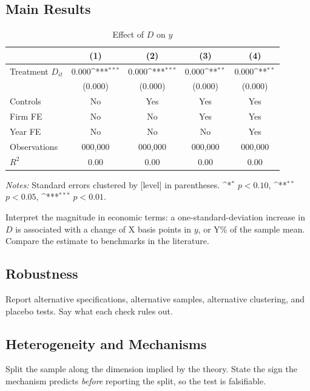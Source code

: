 \documentclass[letterpaper,11pt]{article}
\def\sym#1{\ifmmode^{#1}\else\(^{#1}\)\fi}   %
\begin{document}
\subsection{Main Results}

\begin{table}[htbp]
  \centering
  \caption{Effect of $D$ on $y$}
  \label{tab:main}
  \begin{tabular}{lcccc}
    \toprule
    & (1) & (2) & (3) & (4) \\
    \midrule
    Treatment $D_{it}$ & 0.000\sym{***} & 0.000\sym{***} & 0.000\sym{**} & 0.000\sym{**} \\
                       & (0.000) & (0.000) & (0.000) & (0.000) \\
    \midrule
    Controls           & No  & Yes & Yes & Yes \\
    Firm FE            & No  & No  & Yes & Yes \\
    Year FE            & No  & No  & No  & Yes \\
    Observations       & 000{,}000 & 000{,}000 & 000{,}000 & 000{,}000 \\
    $R^2$              & 0.00 & 0.00 & 0.00 & 0.00 \\
    \bottomrule
  \end{tabular}

  \vspace{0.5em}
  {\footnotesize \textit{Notes:} Standard errors clustered by [level] in
  parentheses. \sym{*} $p<0.10$, \sym{**} $p<0.05$, \sym{***} $p<0.01$.}
\end{table}

Interpret the magnitude in economic terms: a one-standard-deviation increase in
$D$ is associated with a change of X basis points in $y$, or Y\% of the sample
mean. Compare the estimate to benchmarks in the literature.

\subsection{Robustness}

Report alternative specifications, alternative samples, alternative clustering,
and placebo tests. Say what each check rules out.

\subsection{Heterogeneity and Mechanisms}

Split the sample along the dimension implied by the theory. State the sign the
mechanism predicts \textit{before} reporting the split, so the test is
falsifiable.
\end{document}
